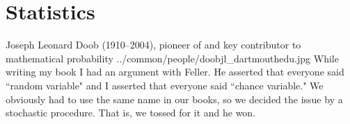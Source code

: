 
\chapter{Statistics}
\label{chp:stats}

\qboxnpq
  {Joseph Leonard Doob (1910--2004), pioneer of and key contributor to mathematical probability\footnotemark}
  {../common/people/doobjl_dartmouthedu.jpg}
  {While writing my book I had an argument with Feller. 
   He asserted that everyone said ``random variable" and I asserted that everyone said ``chance variable." 
   We obviously had to use the same name in our books, so we decided the issue by a stochastic procedure. 
   That is, we tossed for it and he won.}
